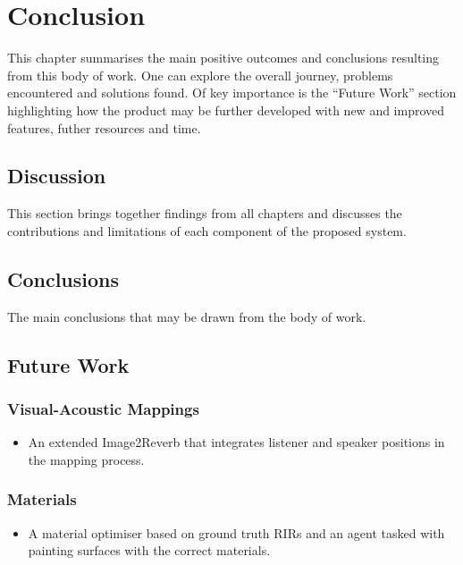 \chapter{Conclusion}\label{ch:Conclusion}

This chapter summarises the main positive outcomes and conclusions resulting from this body of work. One can explore the overall journey, problems encountered and solutions found. Of key importance is the ``Future Work'' section highlighting how the product may be further developed with new and improved features, futher resources and time. 

\section{Discussion}
This section brings together findings from all chapters and discusses the contributions and limitations of each component of the proposed system.
\subsection{}


\section{Conclusions}

The main conclusions that may be drawn from the body of work.

\section{Future Work}

\subsection{Visual-Acoustic Mappings}
\begin{itemize}
    \item An extended Image2Reverb that integrates listener and speaker positions in the mapping process.
\end{itemize}

\subsection{Materials}
\begin{itemize}
    \item A material optimiser based on ground truth RIRs and an agent tasked with painting surfaces with the correct materials.
\end{itemize}

